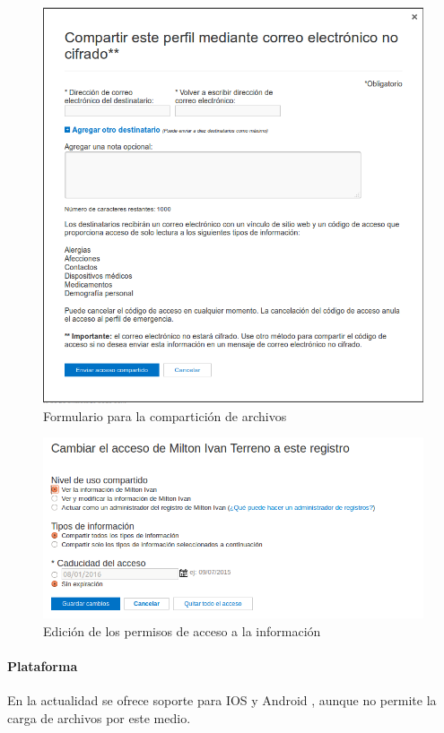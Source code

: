 \begin{itemize}
\begin{itemize}
	\end{itemize}
	\begin{figure} 
      \centering
      \includegraphics[width=.8\textwidth]{img/tp1/3-compartir_perfil}
      \caption{Formulario para la compartición de archivos}
      \label{compartir_perfil}
    \end{figure} 
    
    \begin{figure}[h]
      \centering
      \includegraphics[width=.8\textwidth]{img/tp1/3-cambiar_permisos}
      \caption{Edición de los permisos de acceso a la información}
      \label{cambiar_permisos}
    \end{figure} 

\clearpage
\paragraph{Plataforma}



En la actualidad se ofrece soporte para IOS y Android , aunque no permite la carga de archivos por este medio.


\end{itemize}
